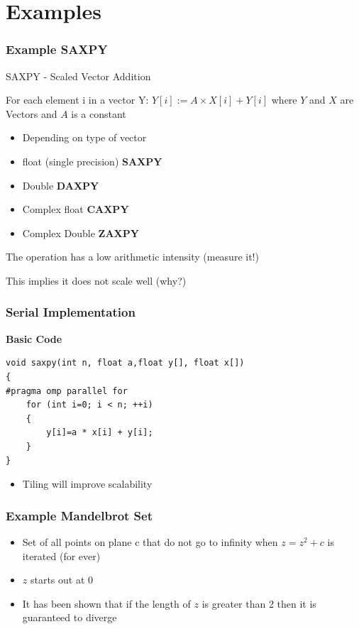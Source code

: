 \documentclass{beamer}
\begin{document}
\section{Examples}
\begin{frame}
	\frametitle{Example SAXPY}
SAXPY - Scaled Vector Addition

For each element i in a vector Y:
$Y[i] := A\times X[i]+Y[i]$
where $Y$ and $X$ are Vectors and $A$ is a constant

\begin{itemize}
	\item Depending on type of vector
	\item float (single precision) \textbf{SAXPY}
	\item Double \textbf{DAXPY}
	\item Complex float \textbf{CAXPY}
	\item Complex Double \textbf{ZAXPY}
\end{itemize}

The operation has a low arithmetic intensity (measure it!)

This implies it does not scale well (why?)
\end{frame}

\begin{frame}[fragile=singleslide]
	\frametitle{Serial Implementation}
\textbf{Basic Code}


\begin{lstlisting}
void saxpy(int n, float a,float y[], float x[])
{
#pragma omp parallel for
	for (int i=0; i < n; ++i)
	{
		y[i]=a * x[i] + y[i];
	}
}
\end{lstlisting}



\begin{itemize}
	\item Tiling will improve scalability
\end{itemize}
\end{frame}

\begin{frame}
	\frametitle{Example Mandelbrot Set}

\begin{itemize}
	\item Set of all points on plane c that do not go to infinity when $z=z^{2}+c$ is iterated (for ever)
	\item $z$ starts out at 0
	\item It has been shown that if the length of $z$ is greater than 2 then it is guaranteed to diverge
\end{itemize}
\end{frame}
\end{document}
